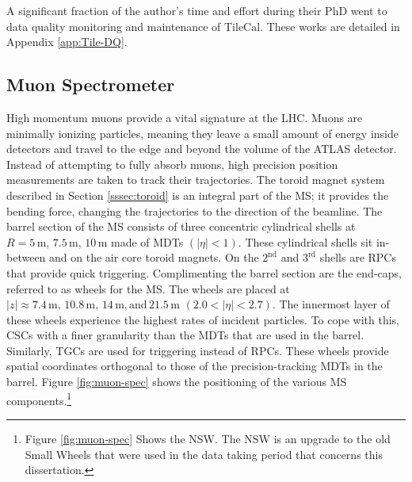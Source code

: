 			A significant fraction of the author's time and effort during their PhD went to data quality monitoring and maintenance of \gls{TileCal}. These works are detailed in Appendix \ref{app:Tile-DQ}.

	\subsection{Muon Spectrometer}\label{ssec:muon-system}
		High momentum muons provide a vital signature at the LHC. Muons are minimally ionizing particles, meaning they leave a small amount of energy inside detectors and travel to the edge and beyond the volume of the \gls{ATLAS} detector. Instead of attempting to fully absorb muons, high precision position measurements are taken to track their trajectories. The toroid magnet system described in Section \ref{sssec:toroid} is an integral part of the \gls{MS}; it provides the bending force, changing the trajectories to the direction of the beamline. The barrel section of the \gls{MS} consists of three concentric cylindrical shells at $R=5 \, \mathrm{ m, }\, 7.5 \, \mathrm{ m, } \,  10 \, \mathrm{ m}$ made of \glspl{MDT} $(|\eta|<1)$. \cite{ATLAS-muon} These cylindrical shells sit in-between and on the air core toroid magnets. On the $2^{\mathrm{nd}}$ and $3^{\mathrm{rd}}$ shells are \glspl{RPC} that provide quick triggering. Complimenting the barrel section are the end-caps, referred to as wheels for the \gls{MS}. The wheels are placed at $|z|\approx 7.4 \, \mathrm{ m, } \, 10.8 \, \mathrm{ m, } \, 14 \, \mathrm{ m, and} \,21.5 \,\mathrm{ m }$ $(2.0 < |\eta| < 2.7)$. The innermost layer of these wheels experience the highest rates of incident particles. To cope with this, \glspl{CSC} with a finer granularity than the \glspl{MDT} that are used in the barrel. Similarly, \glspl{TGC} are used for triggering instead of \glspl{RPC}. These wheels provide spatial coordinates orthogonal to those of the precision-tracking \glspl{MDT} in the barrel. Figure \ref{fig:muon-spec} shows the positioning of the various \gls{MS} components.\footnote{Figure \ref{fig:muon-spec} Shows the \gls{NSW}. The \gls{NSW} is an upgrade to the old Small Wheels that were used in the data taking period that concerns this dissertation.}


